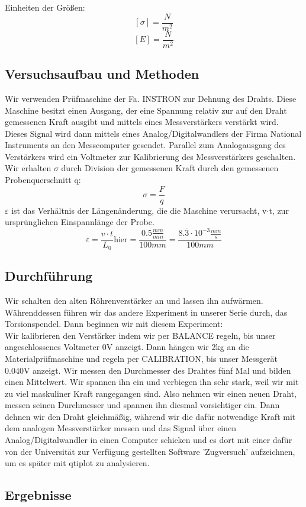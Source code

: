 \documentclass{article}
\begin{document}
Einheiten der Größen:
$$[\sigma]=\frac{N}{m^2}$$
$$[E]=\frac{N}{m^2}$$
\subsection{Versuchsaufbau und Methoden}
Wir verwenden Prüfmaschine der Fa. INSTRON zur Dehnung des Drahts. Diese Maschine besitzt einen Ausgang, der eine Spannung relativ zur auf den Draht gemessenen Kraft ausgibt und mittels eines Messverstärkers verstärkt wird. Dieses Signal wird dann mittels eines Analog/Digitalwandlers der Firma National Instruments an den Messcomputer gesendet. Parallel zum Analogausgang des Verstärkers wird ein Voltmeter zur Kalibrierung des Messverstärkers geschalten.
Wir erhalten $\sigma$ durch Division der gemessenen Kraft durch den gemessenen Probenquerschnitt q:
$$ \sigma = \frac{F}{q}$$
$\varepsilon$ ist das Verhältnis der Längenänderung, die die Maschine verursacht, v$\cdot$t, zur ursprünglichen Einspannlänge der Probe.
$$ \varepsilon = \frac{v\cdot t}{L_0} \text{hier} = \frac{0.5\frac{mm}{min}}{100mm} = \frac{8.\bar{3}\cdot10^{-3}\frac{mm}{s}}{100mm}$$
\subsection{Durchführung}
Wir schalten den alten Röhrenverstärker an und lassen ihn aufwärmen. Währenddessen führen wir das andere Experiment in unserer Serie durch, das Torsionspendel. Dann beginnen wir mit diesem Experiment: \\
Wir kalibrieren den Verstärker indem wir per BALANCE regeln, bis unser angeschlossenes Voltmeter 0V anzeigt. Dann hängen wir 2kg an die Materialprüfmaschine und regeln per CALIBRATION, bis unser Messgerät 0.040V anzeigt.
Wir messen den Durchmesser des Drahtes fünf Mal und bilden einen Mittelwert. Wir spannen ihn ein und verbiegen ihn sehr stark, weil wir mit zu viel maskuliner Kraft rangegangen sind. Also nehmen wir einen neuen Draht, messen seinen Durchmesser und spannen ihn diesmal vorsichtiger ein. Dann dehnen wir den Draht gleichmäßig, während wir die dafür notwendige Kraft mit dem analogen Messverstärker messen und das Signal über einen Analog/Digitalwandler in einen Computer schicken und es dort mit einer dafür von der Universität zur Verfügung gestellten Software 'Zugversuch' aufzeichnen, um es später mit qtiplot zu analysieren.
\subsection{Ergebnisse}
\end{document}
